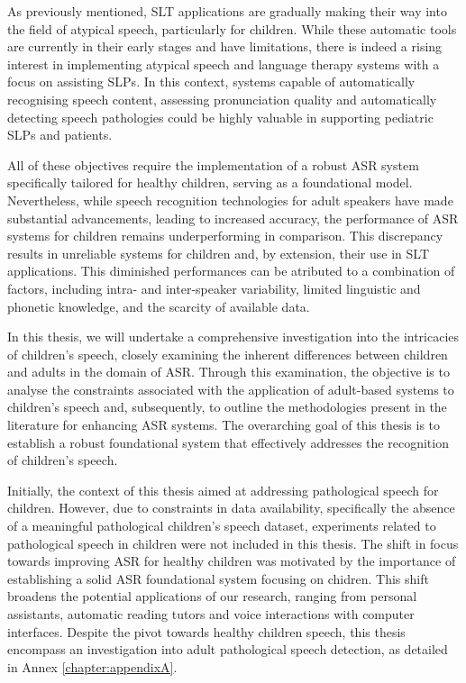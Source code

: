 As previously mentioned, \ac{SLT} applications are gradually making their way into the field of atypical speech, particularly for children. While these automatic tools are currently in their early stages and have limitations, there is indeed a rising interest in implementing atypical speech and language therapy systems with a focus on assisting \acp{SLP}. In this context, systems capable of automatically recognising speech content, assessing pronunciation quality and automatically detecting speech pathologies could be highly valuable in supporting pediatric \acp{SLP} and patients.

All of these objectives require the implementation of a robust \ac{ASR} system specifically tailored for healthy children, serving as a foundational model. Nevertheless, while speech recognition technologies for adult speakers have made substantial advancements, leading to increased accuracy, the performance of \ac{ASR} systems for children remains underperforming in comparison. This discrepancy results in unreliable systems for children and, by extension, their use in \ac{SLT} applications. This diminished performances can be atributed to a combination of factors, including intra- and inter-speaker variability, limited linguistic and phonetic knowledge, and the scarcity of available data.

In this thesis, we will undertake a comprehensive investigation into the intricacies of children's speech, closely examining the inherent differences between children and adults in the domain of \ac{ASR}. Through this examination, the objective is to analyse the constraints associated with the application of adult-based systems to children's speech and, subsequently, to outline the methodologies present in the literature for enhancing \ac{ASR} systems. The overarching goal of this thesis is to establish a robust foundational system that effectively addresses the recognition of children's speech.

Initially, the context of this thesis aimed at addressing pathological speech for children. However, due to constraints in data availability, specifically the absence of a meaningful pathological children's speech dataset, experiments related to pathological speech in children were not included in this thesis. 
The shift in focus towards improving \ac{ASR} for healthy children was motivated by the importance of establishing a solid \ac{ASR} foundational system focusing on chidren. This shift broadens the potential applications of our research, ranging from personal assistants, automatic reading tutors and voice interactions with computer interfaces. Despite the pivot towards healthy children speech, this thesis encompass an investigation into adult pathological speech detection, as detailed in Annex \ref{chapter:appendixA}.


